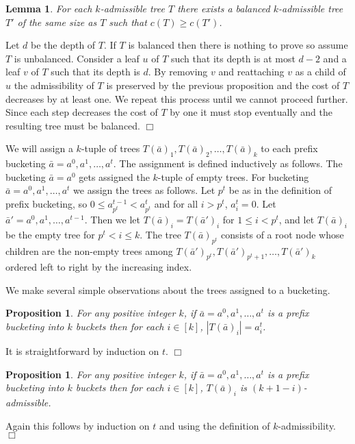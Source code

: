 \documentclass[11pt]{article}
\newtheorem{lemma}[theorem]{Lemma}
\newtheorem{proposition}[theorem]{Proposition}
\newcommand{\qed}{$\Box$}
\newenvironment{proof}{\noindent {\bf Proof:}}{\hfill \qed \smallskip}
\begin{document}
\begin{lemma}
\label{lm:balanced}
For each $k$-admissible tree $T$ there exists a \emph{balanced} $k$-admissible tree $T'$ of the same size as $T$  such that $c(T)\ge c(T')$.
\end{lemma}

\begin{proof}  %
Let $d$ be the depth of $T$. If $T$ is balanced then there is nothing to prove so assume $T$ is unbalanced.
Consider a leaf $u$ of $T$ such that its depth is at most $d-2$ and a leaf $v$ of $T$ such that its depth is $d$.
By removing $v$ and reattaching $v$ as a child of  $u$ the admissibility of $T$ is preserved by the previous proposition and the cost of $T$ decreases by at least one.
We repeat this process until we cannot proceed further. Since each step decreases the cost of $T$ by one it must stop eventually and the resulting tree must be
balanced.
\end{proof}

We will assign a $k$-tuple of trees $T(\bar{a})_1,T(\bar{a})_2,\dotsc,T(\bar{a})_k$
to each prefix bucketing $\bar{a} = a^0,a^1,\dotsc,a^t$.
The assignment is defined inductively as follows.
The bucketing $\bar{a} = a^0$ gets assigned the $k$-tuple of empty trees.
For bucketing $\bar{a} = a^0,a^1,\dotsc,a^t$ we assign the trees as follows.
Let $p^t$ be as in the definition of prefix bucketing,
so $0 \leq a^{t-1}_{p^t} <  a^{t}_{p^t}$ and for all $i>p^t$, $a^t_i = 0$.
Let $\bar{a}'=a^0,a^1,\dotsc,a^{t-1}$.
Then we let $T(\bar{a})_i = T(\bar{a}')_i$ for $1\le i < p^t$,
and let $T(\bar{a})_i$ be the empty tree for $p^t < i \le k$.
The tree $T(\bar{a})_{p^t}$ consists of
a root node whose children are the non-empty trees among 
$T(\bar{a}')_{p^t},T(\bar{a}')_{p^t+1},\dotsc,T(\bar{a}')_k$ 
ordered left to right by the increasing index.

We make several simple observations about the trees assigned to a bucketing.

\begin{proposition}\label{p-ts}
For any positive integer $k$, if $\bar{a} = a^0,a^1,\dotsc,a^t$ is a prefix bucketing into $k$ buckets
then for each $i\in [k]$, $|T(\bar{a})_i| = a^t_i$.
\end{proposition}
\begin{proof}
It is straightforward by induction on $t$.
\end{proof}

\begin{proposition}\label{p-ta}
For any positive integer $k$, if $\bar{a} = a^0,a^1,\dotsc,a^t$ is a prefix bucketing into $k$ buckets then
for each $i\in [k]$, $T(\bar{a})_i$ is $(k+1-i)$-admissible.
\end{proposition}
\begin{proof}
Again this follows by induction on $t$ and using the definition of $k$-admissibility.
\end{proof}
\end{document}

